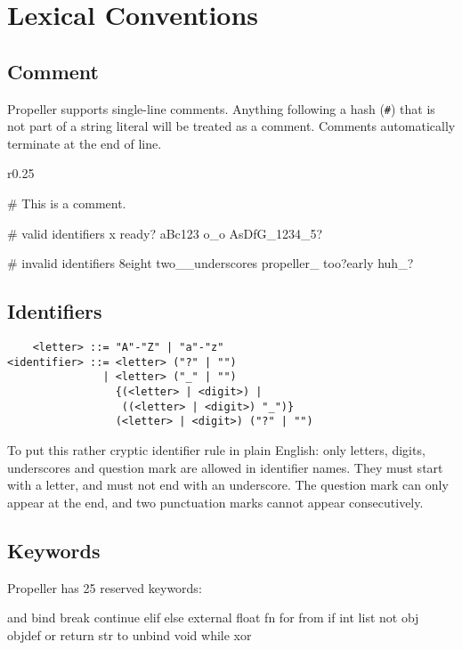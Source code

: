 \section{Lexical Conventions}

\subsection{Comment}
Propeller supports single-line comments. Anything following a hash (\verb|#|) that is not part of a
string literal will be treated as a comment. Comments automatically terminate at the end of line.

\begin{wrapfigure}{r}{0.25\textwidth}
\vspace{-4.5cm}
\begin{mylistingn}
# This is a comment.

# valid identifiers
x
ready?
aBc123
o_o
AsDfG_1234_5?

# invalid identifiers
8eight
two__underscores
propeller_
too?early
huh_?
\end{mylistingn}
\end{wrapfigure}

\subsection{Identifiers}
\begin{verbatim}
    <letter> ::= "A"-"Z" | "a"-"z"
<identifier> ::= <letter> ("?" | "")
               | <letter> ("_" | "")
                 {(<letter> | <digit>) |
                  ((<letter> | <digit>) "_")}
                 (<letter> | <digit>) ("?" | "")
\end{verbatim}

To put this rather cryptic identifier rule in plain English: only letters, digits, underscores and
question mark are allowed in identifier names. They must start with a letter, and must not end with
an underscore. The question mark can only appear at the end, and two punctuation marks cannot appear
consecutively.

\subsection{Keywords}
Propeller has 25 reserved keywords:
\begin{mylistingn}
and  bind     break continue elif
else external float fn       for
from if       int   list     not
obj  objdef   or    return   str
to   unbind   void  while    xor                     
\end{mylistingn}

